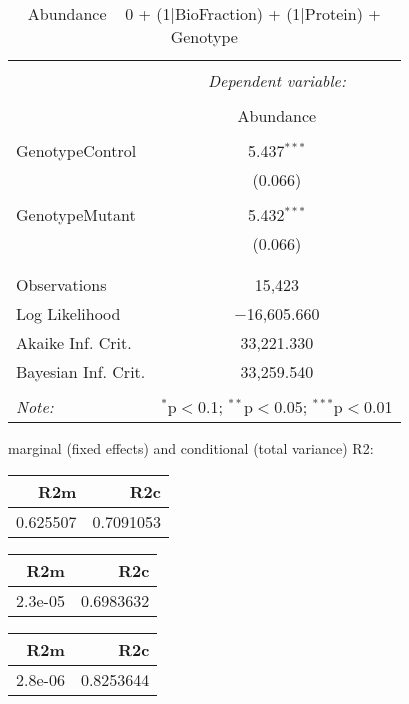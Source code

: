 \documentclass[11pt]{report}
\begin{document}
\begin{table}[!htbp] \centering 
  \caption{Abundance ~ 0 + (1|BioFraction) + (1|Protein) + Genotype} 
  \label{} 
\begin{tabular}{@{\extracolsep{5pt}}lc} 
\\[-1.8ex]\hline 
\hline \\[-1.8ex] 
 & \multicolumn{1}{c}{\textit{Dependent variable:}} \\ 
\cline{2-2} 
\\[-1.8ex] & Abundance \\ 
\hline \\[-1.8ex] 
 GenotypeControl & 5.437$^{***}$ \\ 
  & (0.066) \\ 
  & \\ 
 GenotypeMutant & 5.432$^{***}$ \\ 
  & (0.066) \\ 
  & \\ 
\hline \\[-1.8ex] 
Observations & 15,423 \\ 
Log Likelihood & $-$16,605.660 \\ 
Akaike Inf. Crit. & 33,221.330 \\ 
Bayesian Inf. Crit. & 33,259.540 \\ 
\hline 
\hline \\[-1.8ex] 
\textit{Note:}  & \multicolumn{1}{r}{$^{*}$p$<$0.1; $^{**}$p$<$0.05; $^{***}$p$<$0.01} \\ 
\end{tabular} 
\end{table} 
marginal (fixed effects) and conditional (total variance) R2:

\begin{tabular}{r|r}
\hline
R2m & R2c\\
\hline
0.625507 & 0.7091053\\
\hline
\end{tabular}

\begin{tabular}{r|r}
\hline
R2m & R2c\\
\hline
2.3e-05 & 0.6983632\\
\hline
\end{tabular}

\begin{tabular}{r|r}
\hline
R2m & R2c\\
\hline
2.8e-06 & 0.8253644\\
\hline
\end{tabular}
\end{document}
